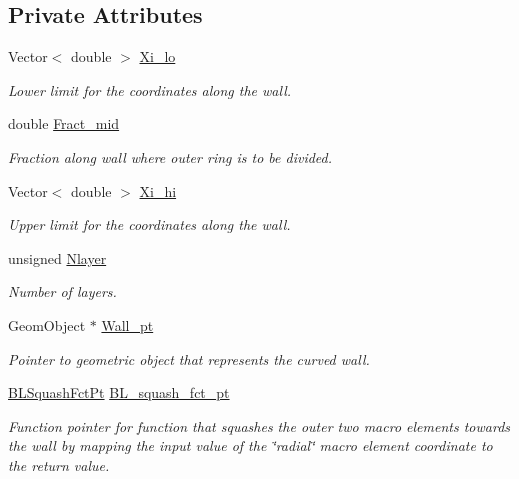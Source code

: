 \subsection*{Private Attributes}
\begin{DoxyCompactItemize}
\item 
Vector$<$ double $>$ \hyperlink{classoomph_1_1QuarterTubeDomain_a63fb621521e3e01a84ae393f73fc7117}{Xi\+\_\+lo}
\begin{DoxyCompactList}\small\item\em Lower limit for the coordinates along the wall. \end{DoxyCompactList}\item 
double \hyperlink{classoomph_1_1QuarterTubeDomain_aed92f9d08bf052a1575d4de159adfb7a}{Fract\+\_\+mid}
\begin{DoxyCompactList}\small\item\em Fraction along wall where outer ring is to be divided. \end{DoxyCompactList}\item 
Vector$<$ double $>$ \hyperlink{classoomph_1_1QuarterTubeDomain_ab28aec59a8756da42f74c0affb7276c2}{Xi\+\_\+hi}
\begin{DoxyCompactList}\small\item\em Upper limit for the coordinates along the wall. \end{DoxyCompactList}\item 
unsigned \hyperlink{classoomph_1_1QuarterTubeDomain_a64d806aba766a439eb6ea49798c50b13}{Nlayer}
\begin{DoxyCompactList}\small\item\em Number of layers. \end{DoxyCompactList}\item 
Geom\+Object $\ast$ \hyperlink{classoomph_1_1QuarterTubeDomain_af394493bc3c3b0f06d9f591e1d02c0f9}{Wall\+\_\+pt}
\begin{DoxyCompactList}\small\item\em Pointer to geometric object that represents the curved wall. \end{DoxyCompactList}\item 
\hyperlink{classoomph_1_1QuarterTubeDomain_a3d8c15c17d9912d8c519c028437c0b2c}{B\+L\+Squash\+Fct\+Pt} \hyperlink{classoomph_1_1QuarterTubeDomain_a2c55367b6f92fa1928326b8e0c62115b}{B\+L\+\_\+squash\+\_\+fct\+\_\+pt}
\begin{DoxyCompactList}\small\item\em Function pointer for function that squashes the outer two macro elements towards the wall by mapping the input value of the \char`\"{}radial\char`\"{} macro element coordinate to the return value. \end{DoxyCompactList}\item 

\end{DoxyCompactItemize}
